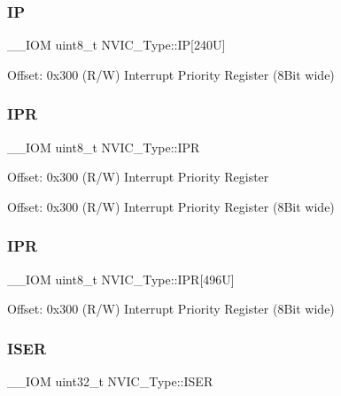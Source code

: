 \subsubsection{\texorpdfstring{IP}{IP}\hspace{0.1cm}{\footnotesize\ttfamily [2/2]}}
{\footnotesize\ttfamily \+\_\+\+\_\+\+I\+OM uint8\+\_\+t N\+V\+I\+C\+\_\+\+Type\+::\+IP\mbox{[}240\+U\mbox{]}}

Offset\+: 0x300 (R/W) Interrupt Priority Register (8\+Bit wide) \mbox{\label{struct_n_v_i_c___type_a71598b2d46c2fa6708a7908a1c63c43c}} 
\subsubsection{\texorpdfstring{I\+PR}{IPR}\hspace{0.1cm}{\footnotesize\ttfamily [1/2]}}
{\footnotesize\ttfamily \+\_\+\+\_\+\+I\+OM uint8\+\_\+t N\+V\+I\+C\+\_\+\+Type\+::\+I\+PR}

Offset\+: 0x300 (R/W) Interrupt Priority Register

Offset\+: 0x300 (R/W) Interrupt Priority Register (8\+Bit wide) \mbox{\label{struct_n_v_i_c___type_adfd45d2d45654c4e775017800f33e9a3}} 
\subsubsection{\texorpdfstring{I\+PR}{IPR}\hspace{0.1cm}{\footnotesize\ttfamily [2/2]}}
{\footnotesize\ttfamily \+\_\+\+\_\+\+I\+OM uint8\+\_\+t N\+V\+I\+C\+\_\+\+Type\+::\+I\+PR\mbox{[}496\+U\mbox{]}}

Offset\+: 0x300 (R/W) Interrupt Priority Register (8\+Bit wide) \mbox{\label{struct_n_v_i_c___type_a06726c729c5557701defc4d6b5d8f9f6}} 
\subsubsection{\texorpdfstring{I\+S\+ER}{ISER}}
{\footnotesize\ttfamily \+\_\+\+\_\+\+I\+OM uint32\+\_\+t N\+V\+I\+C\+\_\+\+Type\+::\+I\+S\+ER}

